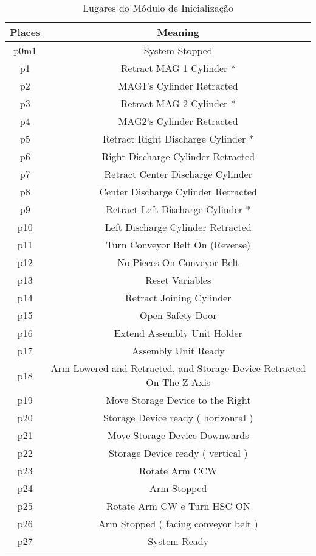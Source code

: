 \begin{table}[htbp]
\caption{Lugares do Módulo de Inicialização}
\centering
\begin{tabular}{c|c}
Places & Meaning\\
\hline
p0m1 & System Stopped\\
p1 & Retract MAG 1 Cylinder *\\
p2 & MAG1's Cylinder Retracted\\
p3 & Retract MAG 2 Cylinder *\\
p4 & MAG2's Cylinder Retracted\\
p5 & Retract Right Discharge Cylinder *\\
p6 & Right Discharge Cylinder Retracted\\
p7 & Retract Center Discharge Cylinder\\
p8 & Center Discharge Cylinder Retracted\\
p9 & Retract Left Discharge Cylinder *\\
p10 & Left Discharge Cylinder Retracted\\
p11 & Turn Conveyor Belt On (Reverse)\\
p12 & No Pieces On Conveyor Belt\\
p13 & Reset Variables\footnotemark\\
p14 & Retract Joining Cylinder\\
p15 & Open Safety Door\\
p16 & Extend Assembly Unit Holder\\
p17 & Assembly Unit Ready\\
p18 & Arm Lowered and Retracted, and Storage Device Retracted On The Z Axis\\
p19 & Move Storage Device to the Right\\
p20 & Storage Device ready ( horizontal )\\
p21 & Move Storage Device Downwards\\
p22 & Storage Device ready ( vertical )\\
p23 & Rotate Arm CCW\\
p24 & Arm Stopped\\
p25 & Rotate Arm CW e Turn HSC ON\\
p26 & Arm Stopped ( facing conveyor belt )\\
p27 & System Ready\\
\end{tabular}
\end{table}

